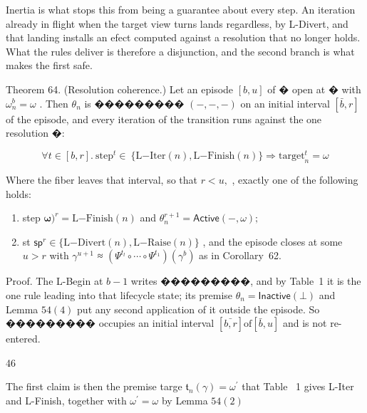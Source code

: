 \documentclass[
  10
]{article}
\begin{document}
Inertia is what stops this from being a guarantee about every step. An
iteration already in flight when the target view turns lands regardless,
by L-Divert, and that landing installs an efect computed against a
resolution that no longer holds. What the rules deliver is therefore a
disjunction, and the second branch is what makes the first safe.

Theorem 64. (Resolution coherence.) Let an episode \([ b , u ]\) of �
open at � with \(\omega _ { n } ^ { b } = \omega\) . Then
\(\theta _ { n }\) is ��������� \(( - , - , - )\) on an initial interval
\([ \bar { b } , r ]\) of the episode, and every iteration of the
transition runs against the one resolution �:

\[
\forall t \in [ b , r ] . \ \mathrm { s t e p } ^ { t } \in \ \{ \mathrm { L } \mathrm { - } \mathrm { I t e r } ( n ) , \mathrm { L } \mathrm { - } \mathrm { F i n i s h } ( n ) \} \Rightarrow \mathrm { t a r g e t } _ { n } ^ { t } = \omega\tag{59}
\]

Where the fiber leaves that interval, so that \(r < u ,\) , exactly one
of the following holds:

\begin{enumerate}
\def\labelenumi{\arabic{enumi}.}
\item
  step
  \(\mathbf { \omega } ) ^ { r } = \mathrm { L } { \mathrm { - F i n i s h } } ( n )\)
  and
  \(\theta _ { n } ^ { r + 1 } = \mathsf { A c t i v e } ( - , \omega ) ;\)
\item
  st
  \(\mathsf { s p } ^ { r } \in \{ \mathrm { L } \mathrm { - D i v e r t } ( n ) , \mathrm { L } \mathrm { - R a i s e } ( n ) \}\)
  , and the episode closes at some \(u > r\) with \(\gamma ^ { u + 1 }\)
  ≈
  \(\left( \Psi ^ { t _ { l } } \circ \cdots \circ \Psi ^ { t _ { 1 } } \right) \left( \gamma ^ { b } \right)\)
  as in Corollary~62.
\end{enumerate}

Proof. The L-Begin at \(b - 1\) writes ���������, and by Table~1 it is
the one rule leading into that lifecycle state; its premise
\(\theta _ { n } = \mathsf { I n a c t i v e } ( \bot )\) and Lemma
\(5 4 ( 4 )\) put any second application of it outside the episode. So
��������� occupies an initial interval
\([ \bar { b , r } ] \mathrm { o f } [ \bar { b } , u ]\) and is not
re-entered.

46

The first claim is then the premise targe
\(\mathfrak { t } _ { n } ( \gamma ) = \omega ^ { \prime }\) that Table~
1 gives L-Iter and L-Finish, together with
\(\omega ^ { \prime } = \omega\) by Lemma \(5 4 ( 2 )\)
\end{document}
